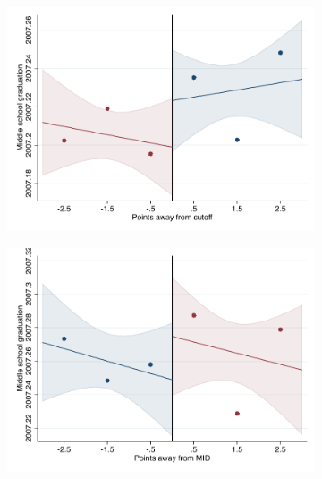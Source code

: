 \documentclass[oneside,11pt]{article}
\begin{document}
\begin{figure}[H]
\begin{center}
    \begin{subfigure}{0.475\textwidth}
        \centering
        \includegraphics[width=\textwidth]{04_Figures/rd_plot_tau_ano_cert_UNAM3.pdf}
    \end{subfigure}
    \begin{subfigure}{0.475\textwidth}
        \centering
        \includegraphics[width=\textwidth]{04_Figures/rd_plot_mid_ano_cert_UNAM3.pdf}
    \end{subfigure}


\end{center}
\end{figure}
\end{document}
